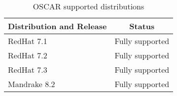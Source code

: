 %
%
%

\begin{table}[htbp]
  \begin{center}
    \begin{tabular}{|l|p{3in}|}
      \hline
      \multicolumn{1}{|c|}{Distribution and Release} &
      \multicolumn{1}{|c|}{Status} \\
      \hline
      \hline
      RedHat 7.1 & Fully supported \\
%
      RedHat 7.2 & Fully supported \\
%
      RedHat 7.3 & Fully supported \\
%
\hline
%
      Mandrake 8.2 & Fully supported \\
      \hline
    \end{tabular}
    \caption{OSCAR supported distributions}
    \label{tab:oscar-distro-support}
  \end{center}
\end{table}
